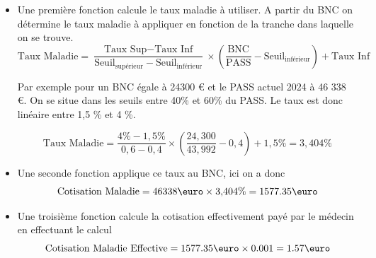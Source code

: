 \begin{itemize}
    \item Une première fonction calcule le taux maladie à utiliser. A partir du BNC on détermine le taux maladie à appliquer en fonction de la tranche dans laquelle on se trouve.
    \begin{equation}
    \text{Taux Maladie} = \frac{\text{Taux Sup} - \text{Taux Inf}}{\text{Seuil}_{\text{supérieur}} - \text{Seuil}_{\text{inférieur}}} \times \left(\frac{\text{BNC}}{\text{PASS}} - \text{Seuil}_{\text{inférieur}}\right) + \text{Taux Inf}
    \end{equation}
    
    Par exemple pour un BNC égale à 24300 € et le PASS actuel 2024 à 46 338 €. On se situe dans les seuils entre 40\% et 60\% du PASS. Le taux est donc linéaire entre 1,5 \% et 4 \%. 
    
    \begin{equation}
    \text{Taux Maladie} = \frac{4\% - 1{,}5\%}{0{,}6 - 0{,}4} \times \left(\frac{24{,}300}{43{,}992} - 0{,}4\right) + 1{,}5\% = 3{,}404\%
    \end{equation}

    \item Une seconde fonction applique ce taux au BNC, ici on a donc
    \begin{equation}
    \text{Cotisation Maladie} = 46 338 \text{\euro} \times 3{,}404\% = 1577.35 \text{\euro}
    \end{equation}

    \item Une troisième fonction calcule la cotisation effectivement payé par le médecin en effectuant le calcul  
    \begin{equation}
    \text{Cotisation Maladie Effective} = 1577.35 \text{\euro} \times 0.001 = 1.57 \text{\euro}
    \end{equation}

\end{itemize}

